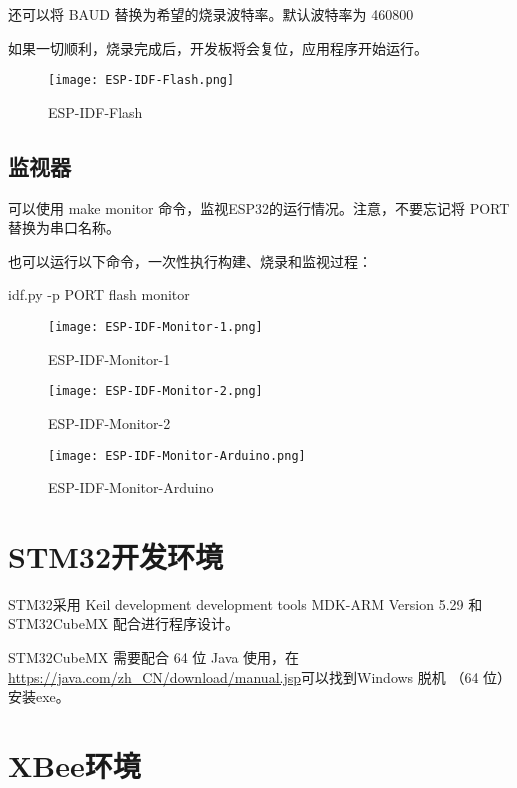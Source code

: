 还可以将 BAUD 替换为希望的烧录波特率。默认波特率为 460800

如果一切顺利，烧录完成后，开发板将会复位，应用程序开始运行。

\begin{figure}[htbp]
    \centering
    \texttt{[image: ESP-IDF-Flash.png]}
    \caption{ESP-IDF-Flash}
    \label{fig:ESP-IDF-Flash}
\end{figure}

\subsection{监视器}

可以使用 make monitor 命令，监视ESP32的运行情况。注意，不要忘记将 PORT 替换为串口名称。

也可以运行以下命令，一次性执行构建、烧录和监视过程：

\begin{tcolorbox}
    idf.py -p PORT flash monitor
\end{tcolorbox}

\begin{figure}[htbp]
    \centering
    \texttt{[image: ESP-IDF-Monitor-1.png]}
    \caption{ESP-IDF-Monitor-1}
    \label{fig:ESP-IDF-Monitor-1}
\end{figure}

\begin{figure}[htbp]
    \centering
    \texttt{[image: ESP-IDF-Monitor-2.png]}
    \caption{ESP-IDF-Monitor-2}
    \label{fig:ESP-IDF-Monitor-2}
\end{figure}

\begin{figure}[htbp]
    \centering
    \texttt{[image: ESP-IDF-Monitor-Arduino.png]}
    \caption{ESP-IDF-Monitor-Arduino}
    \label{fig:ESP-IDF-Monitor-Arduino}
\end{figure}


\section{STM32开发环境}

STM32采用 Keil development development tools MDK-ARM Version 5.29 和 STM32CubeMX 配合进行程序设计。

STM32CubeMX 需要配合 64 位 Java 使用，在\url{https://java.com/zh_CN/download/manual.jsp}可以找到Windows 脱机 （64 位）安装exe。

\section{XBee环境}

